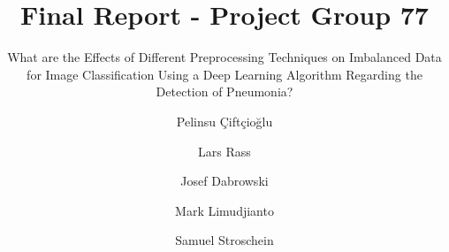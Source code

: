 \documentclass[sigconf]{acmart}
\begin{document}
\title{Final Report - Project Group 77}
\subtitle{What are the Effects of Different Preprocessing Techniques on Imbalanced Data for Image Classification Using a Deep Learning Algorithm Regarding the Detection of Pneumonia?}

\author{Pelinsu Çiftçioğlu}

\author{Lars Rass}

\author{Josef Dabrowski}

\author{Mark Limudjianto}

\author{Samuel Stroschein}

\renewcommand{\shortauthors}{Group 77: P. Çiftçioğlu, L. Rass, J. Dabrowski, M. Limudjianto, S. Stroschein}

\begin{abstract}

\end{abstract}


\maketitle






















\end{document}
